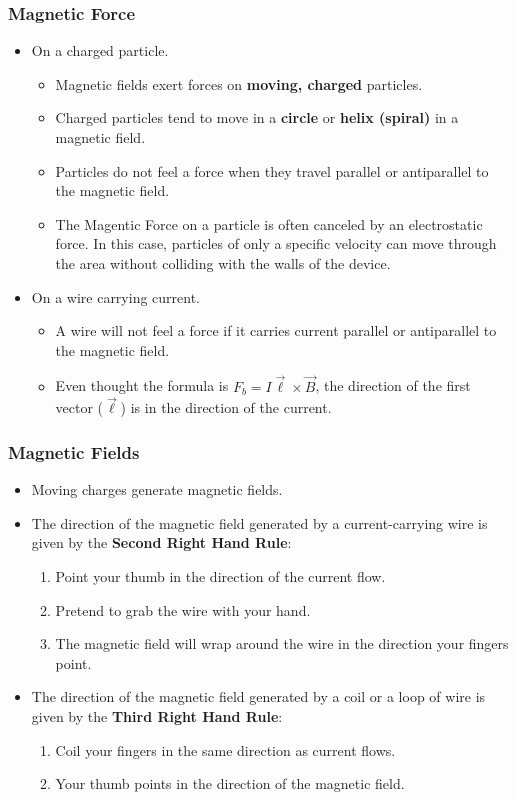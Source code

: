 \documentclass[letterpaper, 12pt]{article}
\begin{document}
\subsubsection*{Magnetic Force}
\begin{itemize}
	\item On a charged particle.
		\begin{itemize}
			\item Magnetic fields exert forces on \textbf{moving, charged} particles.
			\item Charged particles tend to move in a \textbf{circle} or \textbf{helix (spiral)} in a magnetic field.
			\item Particles do not feel a force when they travel parallel or antiparallel to the magnetic field. 
			\item The Magentic Force on a particle is often canceled by an electrostatic force.  In this case, particles of only a specific velocity can move through the area without colliding with the walls of the device.
			
		\end{itemize}
	\item On a wire carrying current.
		\begin{itemize}
			\item A wire will not feel a force if it carries current parallel or antiparallel to the magnetic field.
			\item Even thought the formula is $ F_b = I \vec{\ell} \times \vec{B} $, the direction of the first vector ($\vec{\ell}$) is in the direction of the current. 
		\end{itemize}
	
\end{itemize}

\subsubsection*{Magnetic Fields}
\vspace{-.3cm}
\begin{itemize}
	\item Moving charges generate magnetic fields. 
	\item The direction of the magnetic field generated by a current-carrying wire is given by the \textbf{Second Right Hand Rule}: 
	\begin{enumerate}
		\item Point your thumb in the direction of the current flow.  
		\item Pretend to grab the wire with your hand.  
		\item The magnetic field will wrap around the wire in the direction your fingers point.
	\end{enumerate}
	\item The direction of the magnetic field generated by a coil or a loop of wire is given by the \textbf{Third Right Hand Rule}:
	\begin{enumerate}
		\item Coil your fingers in the same direction as current flows.  
		\item Your thumb points in the direction of the magnetic field. 
	\end{enumerate}
\end{itemize}
\end{document}
